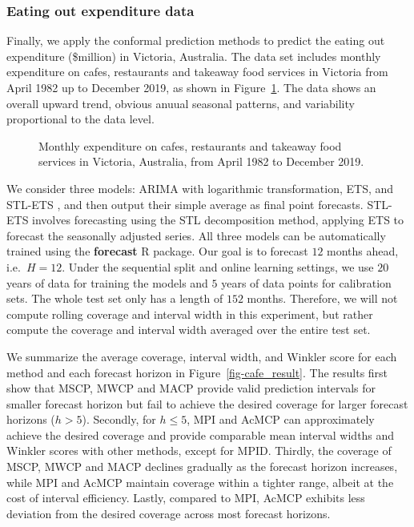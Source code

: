 \documentclass[
  11pt,
  a4paper,
]{article}
\theoremstyle{plain}
\theoremstyle{plain}
\theoremstyle{remark}
\begin{document}
\subsubsection{Eating out expenditure
data}\label{eating-out-expenditure-data}

Finally, we apply the conformal prediction methods to predict the eating
out expenditure (\$million) in Victoria, Australia. The data set
includes monthly expenditure on cafes, restaurants and takeaway food
services in Victoria from April 1982 up to December 2019, as shown in
Figure~\ref{fig-cafe_data}. The data shows an overall upward trend,
obvious anuual seasonal patterns, and variability proportional to the
data level.

\begin{figure}


\caption{\label{fig-cafe_data}Monthly expenditure on cafes, restaurants
and takeaway food services in Victoria, Australia, from April 1982 to
December 2019.}

\end{figure}%

We consider three models: ARIMA with logarithmic transformation, ETS,
and STL-ETS \autocite{hyndman2021}, and then output their simple average
as final point forecasts. STL-ETS involves forecasting using the STL
decomposition method, applying ETS to forecast the seasonally adjusted
series. All three models can be automatically trained using the
\textbf{forecast} R package. Our goal is to forecast \(12\) months
ahead, i.e.~\(H=12\). Under the sequential split and online learning
settings, we use \(20\) years of data for training the models and \(5\)
years of data points for calibration sets. The whole test set only has a
length of \(152\) months. Therefore, we will not compute rolling
coverage and interval width in this experiment, but rather compute the
coverage and interval width averaged over the entire test set.

We summarize the average coverage, interval width, and Winkler score for
each method and each forecast horizon in Figure~\ref{fig-cafe_result}.
The results first show that MSCP, MWCP and MACP provide valid prediction
intervals for smaller forecast horizon but fail to achieve the desired
coverage for larger forecast horizons (\(h>5\)). Secondly, for
\(h \leq 5\), MPI and AcMCP can approximately achieve the desired
coverage and provide comparable mean interval widths and Winkler scores
with other methods, except for MPID. Thirdly, the coverage of MSCP, MWCP
and MACP declines gradually as the forecast horizon increases, while MPI
and AcMCP maintain coverage within a tighter range, albeit at the cost
of interval efficiency. Lastly, compared to MPI, AcMCP exhibits less
deviation from the desired coverage across most forecast horizons.
\end{document}
